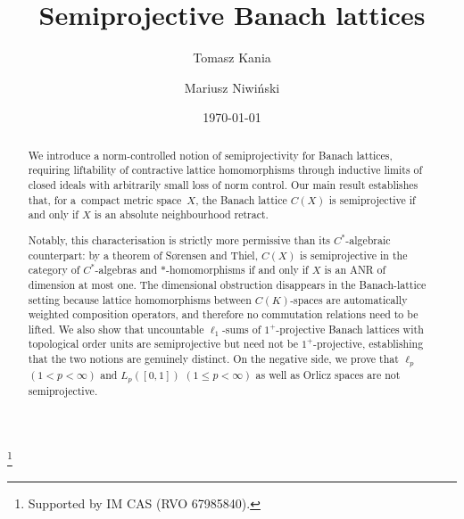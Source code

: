 \documentclass[11pt]{amsart}
\renewcommand{\le}{\leqslant}
\numberwithin{equation}{section}
\theoremstyle{definition}
\theoremstyle{remark}
\theoremstyle{plain}
\begin{document}
\title[Semiprojective Banach lattices]{Semiprojective Banach lattices}

\author[T.~Kania]{Tomasz Kania}
\address{Institute of Mathematics, Czech Academy of Sciences,
\v{Z}itn\'{a} 25, 115~67 Prague 1, Czech Republic
\& Institute of Mathematics, Jagiellonian University,
{\L}ojasiewicza 6, 30-348 Krak\'ow, Poland}
\thanks{Supported by IM CAS (RVO 67985840).}

\author[M.~Niwi\'nski]{Mariusz Niwi\'nski}
\address{Doctoral School of Exact and Natural Sciences,
Faculty of Mathematics and Computer Science,
Institute of Mathematics, Jagiellonian University,
{\L}ojasiewicza 6, 30-348 Krak\'ow, Poland}

\date{\today}


\begin{abstract}
We introduce a norm-controlled notion of semiprojectivity for Banach lattices,
requiring liftability of contractive lattice homomorphisms through inductive limits of closed ideals
with arbitrarily small loss of norm control.
Our main result establishes that, for a~compact metric space~$X$,
the Banach lattice $C(X)$ is semiprojective if and only if $X$ is an absolute neighbourhood retract.

Notably, this characterisation is strictly more permissive than its $C^*$-algebraic counterpart:
by a theorem of S\o rensen and Thiel,
$C(X)$ is semiprojective in the category of $C^*$-algebras and $*$-homo\-morphisms
if and only if $X$ is an ANR of dimension at most one.
The dimensional obstruction disappears in the Banach-lattice setting because lattice homomorphisms
between $C(K)$-spaces are automatically weighted composition operators,
and therefore no commutation relations need to be lifted.
We also show that uncountable $\ell_1$-sums of $1^+$-projective Banach lattices
with topological order units are semiprojective but need not be $1^+$-projective,
establishing that the two notions are genuinely distinct.
On the negative side, we prove that $\ell_p$ \((1<p<\infty)\) and \(L_p([0,1])\) \((1\le p<\infty)\) as well as Orlicz spaces
are not semiprojective.
\end{abstract}

\maketitle
\end{document}
